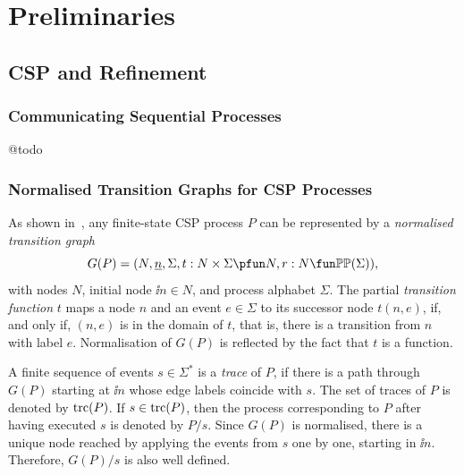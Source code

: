 \section{Preliminaries}
\label{section:preliminaries}


 
\subsection{CSP and Refinement}


\subsubsection*{Communicating Sequential Processes} @todo

\subsubsection*{Normalised Transition Graphs for CSP Processes}
\label{sec:ntg}

As shown in~\cite{Roscoe:1994:CME:197600}, any finite-state CSP process $P$
can be represented by a \emph{normalised transition graph}
$$
G(P) = ( N, \ii n, \Sigma, t : N\times\Sigma \pfun N, r : N \fun \mathbb{P}\mathbb{P}(\Sigma)),
$$
with nodes $N$, initial node $\ii n\in N$, and process alphabet $\Sigma$. The
partial \emph{transition function} $t$ maps a node $n$ and an event
$e\in\Sigma$ to its successor node $t(n,e)$, if, and only if, $(n,e)$ is in
the domain of $t$, that is, there is a transition from $n$ with label $e$.
Normalisation of $G(P)$ is reflected by the fact that $t$ is a function.

A finite sequence of events $s\in\Sigma^*$ is a \emph{trace} of $P$, if there
is a path through $G(P)$ starting  at $\ii n$ whose edge labels coincide with
$s$. The set of traces of $P$ is denoted by $\text{trc}(P)$. If $s\in\text{trc}(P)$, then
the process corresponding to $P$ after having executed $s$ is denoted by
$P/s$. Since $G(P)$ is normalised, there is a unique node reached by applying
the events from $s$ one by one, starting in $\ii n$. Therefore, $G(P)/s$  is
also well defined.

